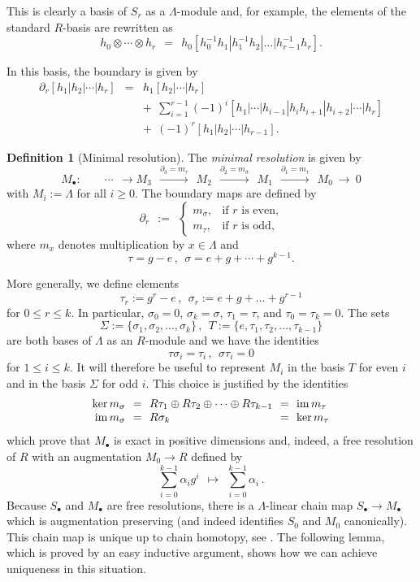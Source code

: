 \documentclass[11pt,a4paper,draft]{article}
\newcommand{\tens}{\otimes}
\DeclareMathOperator\Bild{im}
\DeclareMathOperator\Kern{ker}
\newcommand\im{\Bild}
\renewcommand\ker{\Kern}
\newcommand{\dd}{\partial}
\theoremstyle{definition}
\newtheorem{definition}[theorem]{Definition}
\begin{document}
This is clearly a basis of $S_r$ as a
$\Lambda$-module and, for example, the elements of the standard $R$-basis are
rewritten as
\[
    h_0 \tens \cdots \tens h_r\ \ =\ \
    h_0[h_0^{-1}h_1|h_1^{-1}h_2|\dots|h_{r-1}^{-1}h_r].
\]

In this basis, the boundary is given by
\begin{eqnarray*}
    \dd_r[h_1|h_2|\cdots|h_r]
        &=&  h_1[h_2|\cdots|h_r] \\
        &&+\ \  \sum_{i=1}^{r-1} (-1)^i
                [h_1|\cdots|h_{i-1}|h_ih_{i+1}|h_{i+2}|\cdots|h_r] \\
        &&+\ \  (-1)^r[h_1|h_2|\cdots|h_{r-1}].
\end{eqnarray*}


\begin{definition}[Minimal resolution]
The \emph{minimal resolution}  is given by
\[  M_\bullet : \qquad
 \cdots \ \  \longrightarrow M_3
    \ \ \stackrel{\dd_3 = m_\tau}{\longrightarrow}\ \ M_2
    \ \ \stackrel{\dd_2 = m_\sigma}{\longrightarrow}\ \  M_1
    \ \ \stackrel{\dd_1 = m_\tau}{\longrightarrow}\ \  M_0\ \longrightarrow\ 0
\]
with $M_i := \Lambda$ for all $i \ge 0$. The boundary maps are defined by
\[
\dd_r\ \ :=\ \
\begin{cases}
    m_\sigma, & \text{if $r$ is even,}\\
    m_\tau,   & \text{if $r$ is odd,}
\end{cases}
\]
where $m_x$ denotes multiplication by $x \in \Lambda$ and
\[\tau = g - e \, , ~~ \sigma = e + g + \cdots + g^{k-1}.\]
\end{definition}

More generally, we define elements
\[
  \tau_r := g^r - e \, , ~~  \sigma_r := e + g + \ldots + g^{r-1} 
\]
for $0 \leq r \leq k$. In particular, $\sigma_0 = 0$, $\sigma_k = \sigma$, $\tau_1 = \tau$, and $\tau_0 = \tau_k = 0$.
The sets
\[
    \Sigma := \{ \sigma_1, \sigma_2, \dots, \sigma_k \} \, , ~~
      T    := \{ e, \tau_1, \tau_2, \dots, \tau_{k-1} \} 
\]
are both bases of
$\Lambda$ as an $R$-module and we have
the identities
\[
    \tau\sigma_i  = \tau_i \, , ~~ \sigma \tau_i = 0
\]
for $1 \leq i \leq k$.
It will therefore be useful to represent $M_i$ in the basis $T$ for even $i$ and in the basis $\Sigma$
for odd $i$.  This choice is justified by the identities
\[
\begin{array}{r@{=}l@{=}l}
    \ker m_\sigma \ \ & \ \  R\tau_1 \oplus R\tau_2 \oplus \cdots \oplus
    R\tau_{k-1} \ \ &\ \  \im m_\tau \\
    \im m_\sigma \ \ &\ \ R \sigma_k \ \ &\ \ \ker m_\tau
\end{array}
\]
which prove that $M_\bullet$ is exact in positive dimensions and, indeed,
a free resolution of $R$ with an augmentation $M_0 \to R$ defined by
\[
      \sum_{i=0}^{k-1} \alpha_i g^i\ \ \mapsto\ \ \sum_{i=0}^{k-1} \alpha_i \, .
\]
Because $S_\bullet$ and $M_{\bullet}$ are free resolutions,
there is a  $\Lambda$-linear chain map $S_\bullet \to M_\bullet$
which is augmentation preserving (and indeed identifies $S_0$ and $M_0$ canonically).  
This chain map is unique up to chain homotopy, 
see \cite[Lemma~7.4]{brown82:_cohom_group}.
The following lemma, which is proved by an easy inductive argument,
shows how we can achieve uniqueness in this situation.
\end{document}
